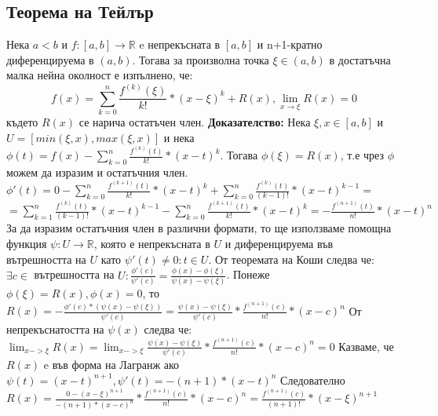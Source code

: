 \documentclass[fleqn,12pt]{article}
\begin{document}
\begin{flushleft}
\subsection{Теорема на Тейлър}
Нека $a<b$ и $f:[a,b]\rightarrow\mathbb{R}$ e непрекъсната в $[a,b]$ и n+1-кратно диференцируема в $(a,b)$. Тогава за произволна точка $\xi \in (a,b)$ в достатъчна малка нейна околност е изпълнено, че:
\[f(x)=\sum_{k = 0}^{n} \frac{f^{(k)}(\xi)}{k!}*(x-\xi)^k + R(x), \lim_{x \rightarrow \xi} R(x) = 0\]
където $R(x)$ се нарича остатъчен член.
\bigbreak
\textbf{Доказателство:}
Нека $\xi,x \in [a,b]$ и $U=[min(\xi,x),max(\xi,x)]$ и нека $\phi(t) = f(x) - \sum_{k = 0}^{n} \frac{f^{(k)}(t)}{k!}*(x-t)^{k}$.
Тогава $\phi(\xi)=R(x)$, т.е чрез $\phi$ можем да изразим и остатъчния член.
\bigbreak
$\phi'(t)=0 - \sum_{k=0}^{n} \frac{f^{(k+1)}(t)}{k!}*(x-t)^{k} +  \sum_{k=0}^{n}\frac{f^{(k)}(t)}{(k-1)!}*(x-t)^{k-1} =$
$=\sum_{k=1}^{n}\frac{f^{(k)}(t)}{(k-1)!}*(x-t)^{k-1} - \sum_{k=0}^{n} \frac{f^{(k+1)}(t)}{k!}*(x-t)^{k} = -\frac{f^{(n+1)}(t)}{n!}*(x-t)^n$
\bigbreak
За да изразим остатъчния член в различни формати, то ще използваме помощна функция $\psi:U\rightarrow\mathbb{R}$, която е непрекъсната в $U$ и диференцируема във вътрешността на $U$ като $\psi'(t) \neq 0 : t \in U$.
От теоремата на Коши следва че: $\exists c \in$ вътрешността на $U: \frac{\phi'(c)}{\psi'(c)}=\frac{\phi(x)-\phi(\xi)}{\psi(x)-\psi(\xi)}$.
\bigbreak
Понеже $\phi(\xi) = R(x), \phi(x) = 0$, то $R(x) = -\frac{\phi'(c)*(\psi(x)-\psi(\xi))}{\psi'(c)} = \frac{\psi(x)-\psi(\xi)}{\psi'(c)}*\frac{f^{(n+1)}(c)}{n!}*(x-c)^n$\newline
От непрекъснатостта на $\psi(x)$ следва че: $\lim_{x->\xi} R(x) = \lim_{x->\xi} \frac{\psi(x)-\psi(\xi)}{\psi'(c)}*\frac{f^{(n+1)}(c)}{n!}*(x-c)^n = 0$
\bigbreak
Казваме, че $R(x)$ e във форма на Лагранж ако $\psi(t)=(x-t)^{n+1}, \psi'(t)=-(n+1)*(x-t)^n$
Следователно $R(x)=\frac{0-(x-\xi)^{n+1}}{-(n+1)*(x-c)^n}*\frac{f^{(n+1)}(c)}{n!}*(x-c)^n = \frac{f^{(n+1)}(c)}{(n+1)!}*(x-\xi)^{n+1}$


\end{flushleft}
\end{document}
